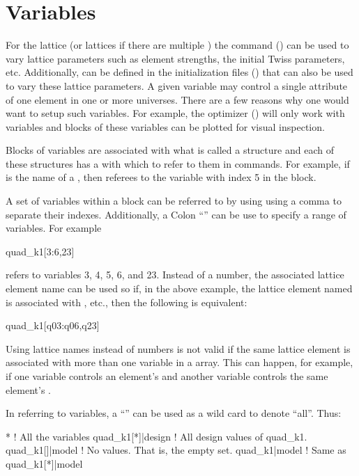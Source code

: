 \chapter{Variables}
\label{c:var}

For the  lattice (or lattices if there are multiple ) the
 command () can be used to vary lattice parameters such as
element strengths, the initial Twiss parameters, etc.  Additionally,  can be
defined in the \tao initialization files () that can also be used to vary
these  lattice parameters.  A given \tao variable may control a single attribute
of one element in one or more universes.  There are a few reasons why one would want to
setup such variables.  For example, the optimizer () will only work with
\tao variables and blocks of these variables can be plotted for visual inspection.

Blocks of variables are associated with what is called a 
structure and each of these structures has a  with which to
refer to them in \tao commands. For example, if  is the
name of a , then  referees to the variable 
with index 5 in the block. 

A set of variables within a  block
can be referred to by using using a comma \vn{,} to
separate their indexes. Additionally, a Colon ``\vn{:}'' can be use to
specify a range of variables. For example
\begin{example}
  quad_k1[3:6,23]
\end{example}
refers to variables 3, 4, 5, 6, and 23. Instead of a number, the
associated lattice element name can be used so if, in the above
example, the lattice element named  is associated with
, etc., then the following is equivalent:
\begin{example}
  quad_k1[q03:q06,q23]
\end{example}
Using lattice names instead of numbers is not valid if the same
lattice element is associated with more than one variable in a
 array. This can happen, for example, if one variable controls
an element's  and another variable controls the same element's
. 

In referring to variables, a ``\vn{*}'' can be used as a wild card to 
denote ``all''. Thus:
\begin{example}
  *                 ! All the variables
  quad_k1[*]|design ! All design values of quad_k1.
  quad_k1[]|model   ! No values. That is, the empty set.
  quad_k1|model     ! Same as quad_k1[*]|model
\end{example}


